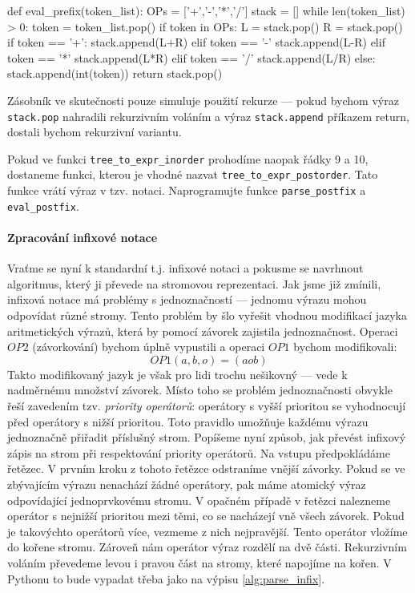\begin{python}
def eval_prefix(token_list):
    OPs = ['+','-','*','/']
    stack = []
    while len(token_list) > 0:
        token = token_list.pop()
        if token in OPs:
          L = stack.pop()
          R = stack.pop()
          if token == '+':
            stack.append(L+R)
          elif token == '-'
            stack.append(L-R)
          elif token == '*'
            stack.append(L*R)
          elif token == '/'
            stack.append(L/R)
        else:
          stack.append(int(token))
    return stack.pop()
\end{python}

Zásobník ve skutečnosti pouze simuluje použití rekurze --- pokud bychom 
výraz {\tt stack.pop} nahradili rekurzivním voláním a výraz {\tt stack.append}
příkazem return, dostali bychom rekurzivní variantu.

\begin{cviceni} Pokud ve funkci {\tt tree\_to\_expr\_inorder} prohodíme naopak
řádky 9 a 10, dostaneme funkci, kterou je vhodné nazvat 
{\tt tree\_to\_expr\_postorder}. Tato funkce vrátí výraz v tzv. 
notaci. Naprogramujte funkce {\tt parse\_postfix} a {\tt eval\_postfix}.
\end{cviceni}

\paragraph{Zpracování infixové notace}
Vraťme se nyní k standardní t.j. infixové notaci a pokusme se navrhnout
algoritmus, který ji převede na stromovou reprezentaci. Jak jsme již zmínili,
infixová notace má problémy s jednoznačností --- jednomu výrazu mohou odpovídat
různé stromy. Tento problém by šlo vyřešit vhodnou modifikací jazyka aritmetických
výrazů, která by pomocí závorek zajistila jednoznačnost. Operaci \(OP2\) (závorkování)
bychom úplně vypustili a operaci \(OP1\) bychom modifikovali:
\[
 OP1(a,b,o) = (aob)
\]
Takto modifikovaný jazyk je však pro lidi trochu nešikovný --- vede k nadměrnému
množství závorek. Místo toho se problém jednoznačnosti obvykle řeší zavedením
tzv. \emph{priority operátorů}: operátory s vyšší prioritou se vyhodnocují před
operátory s nižší prioritou. Toto pravidlo umožňuje každému výrazu jednoznačně
přiřadit příslušný strom. Popíšeme nyní způsob, jak převést infixový zápis
na strom při respektování priority operátorů. Na vstupu předpokládáme řetězec.
V prvním kroku z tohoto řetězce odstraníme vnější závorky. Pokud se ve zbývajícím
výrazu nenachází žádné operátory, pak máme atomický výraz odpovídající jednoprvkovému
stromu. V opačném případě v řetězci nalezneme operátor s nejnižší prioritou mezi 
těmi, co se nacházejí vně všech závorek. Pokud je takovýchto operátorů více, 
vezmeme z nich nejpravější. Tento operátor vložíme do kořene stromu. Zároveň
nám operátor výraz rozdělí na dvě části. Rekurzivním voláním převedeme levou i
pravou část na stromy, které napojíme na kořen. V Pythonu to bude vypadat
třeba jako na výpisu \ref{alg:parse_infix}.


